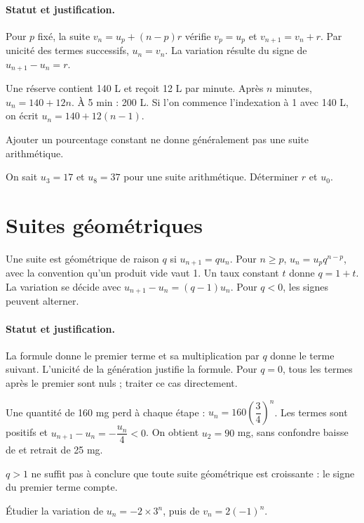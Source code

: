 \paragraph{Statut et justification.} Pour $p$ fixé, la suite $v_n=u_p+(n-p)r$ vérifie $v_p=u_p$ et $v_{n+1}=v_n+r$. Par unicité des termes successifs, $u_n=v_n$. La variation résulte du signe de $u_{n+1}-u_n=r$.
\begin{example}Une réserve contient 140 L et reçoit 12 L par minute. Après $n$ minutes, $u_n=140+12n$. À 5 min : 200 L. Si l’on commence l’indexation à 1 avec 140 L, on écrit $u_n=140+12(n-1)$.\end{example}\label{C01-EX2}
\begin{pitfall}Ajouter un pourcentage constant ne donne généralement pas une suite arithmétique.\end{pitfall}
\begin{application}On sait $u_3=17$ et $u_8=37$ pour une suite arithmétique. Déterminer $r$ et $u_0$.\end{application}\label{C01-AP2}
\section{Suites géométriques}\label{C01-U3}
\begin{keypoint}
Une suite est géométrique de raison $q$ si $u_{n+1}=qu_n$. Pour $n\geq p$, $u_n=u_pq^{n-p}$, avec la convention qu’un produit vide vaut 1. Un taux constant $t$ donne $q=1+t$. La variation se décide avec $u_{n+1}-u_n=(q-1)u_n$. Pour $q<0$, les signes peuvent alterner.
\end{keypoint}
\paragraph{Statut et justification.} La formule donne le premier terme et sa multiplication par $q$ donne le terme suivant. L’unicité de la génération justifie la formule. Pour $q=0$, tous les termes après le premier sont nuls ; traiter ce cas directement.
\begin{example}Une quantité de 160 mg perd  à chaque étape : $u_n=160(\dfrac{3}{4})^n$. Les termes sont positifs et $u_{n+1}-u_n=-\dfrac{u_n}{4}<0$. On obtient $u_2=90$ mg, sans confondre baisse de  et retrait de 25 mg.\end{example}\label{C01-EX3}
\begin{pitfall}$q>1$ ne suffit pas à conclure que toute suite géométrique est croissante : le signe du premier terme compte.\end{pitfall}
\begin{application}Étudier la variation de $u_n=-2\times3^n$, puis de $v_n=2(-1)^n$.\end{application}\label{C01-AP3}
